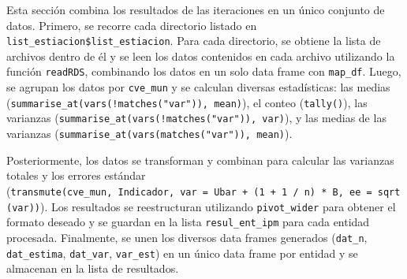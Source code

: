 \documentclass[
  12pt,
]{book}
\begin{document}
Esta sección combina los resultados de las iteraciones en un único conjunto de datos. Primero, se recorre cada directorio listado en \texttt{list\_estiacion\$list\_estiacion}. Para cada directorio, se obtiene la lista de archivos dentro de él y se leen los datos contenidos en cada archivo utilizando la función \texttt{readRDS}, combinando los datos en un solo data frame con \texttt{map\_df}. Luego, se agrupan los datos por \texttt{cve\_mun} y se calculan diversas estadísticas: las medias (\texttt{summarise\_at(vars(!matches("var")),\ mean)}), el conteo (\texttt{tally()}), las varianzas (\texttt{summarise\_at(vars(!matches("var")),\ var)}), y las medias de las varianzas (\texttt{summarise\_at(vars(matches("var")),\ mean)}).

Posteriormente, los datos se transforman y combinan para calcular las varianzas totales y los errores estándar (\texttt{transmute(cve\_mun,\ Indicador,\ var\ =\ Ubar\ +\ (1\ +\ 1\ /\ n)\ *\ B,\ ee\ =\ sqrt(var))}). Los resultados se reestructuran utilizando \texttt{pivot\_wider} para obtener el formato deseado y se guardan en la lista \texttt{resul\_ent\_ipm} para cada entidad procesada. Finalmente, se unen los diversos data frames generados (\texttt{dat\_n}, \texttt{dat\_estima}, \texttt{dat\_var}, \texttt{var\_est}) en un único data frame por entidad y se almacenan en la lista de resultados.
\end{document}
